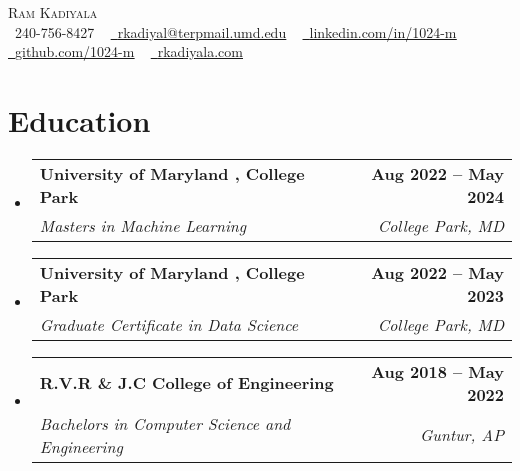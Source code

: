 \documentclass[letterpaper,11pt]{article}
\makeatletter
\newcommand{\resumeSubheading}[4]{
  \vspace{-2pt}\item
    \begin{tabular*}{1.0\textwidth}[t]{l@{\extracolsep{\fill}}r}
      \textbf{#1} & \textbf{\small #2} \\
      \textit{\small#3} & \textit{\small #4} \\
    \end{tabular*}\vspace{-7pt}
}
\newcommand{\resumeSubHeadingListStart}{\begin{itemize}[leftmargin=0.0in, label={}]}
\newcommand{\resumeSubHeadingListEnd}{\end{itemize}}
\makeatother
\begin{document}
\begin{center}
    {\Huge \scshape \textcolor{myColor1}{Ram Kadiyala}} \\ \vspace{1pt}
    \small \raisebox{-0.1\height}\faPhone\ \textcolor{myColor2}{240-756-8427} ~ \href{mailto:rkadiyal@terpmail.umd.edu}{\raisebox{-0.2\height}\faEnvelope\  \underline{\textcolor{myColor2}{rkadiyal@terpmail.umd.edu}}} ~ 
    \href{https://linkedin.com/in/1024-m/}{\raisebox{-0.2\height}\faLinkedin\ \underline{\textcolor{myColor2}{linkedin.com/in/1024-m}}}  ~
    \href{https://github.com/1024-m}{\raisebox{-0.2\height}\faGithub\ \underline{\textcolor{myColor2}{github.com/1024-m}}} ~
    \href{https://www.rkadiyala.com}{\raisebox{-0.2\height}\faGlobe\ \underline{\textcolor{myColor2}{rkadiyala.com}}}
    \vspace{-10pt}
\end{center}
\section{\textcolor{myColor1}{Education}}
  \resumeSubHeadingListStart
    \resumeSubheading
      {\textcolor{myColor2}{University of Maryland , College Park}}{\textcolor{myColor2}{Aug 2022 -- May 2024}}
      {Masters in Machine Learning}{College Park, MD}\vspace{-4pt}
    \resumeSubheading
      {\textcolor{myColor2}{University of Maryland , College Park}}{\textcolor{myColor2}{Aug 2022 -- May 2023}}
      {Graduate Certificate in Data Science}{College Park, MD}\vspace{-4pt}
    \resumeSubheading
      {\textcolor{myColor2}{R.V.R \& J.C College of Engineering}}{\textcolor{myColor2}{Aug 2018 -- May 2022}}
      {Bachelors in Computer Science and Engineering}{Guntur, AP}\vspace{-4pt}
  \resumeSubHeadingListEnd
  \vspace{-15pt}
\end{document}
